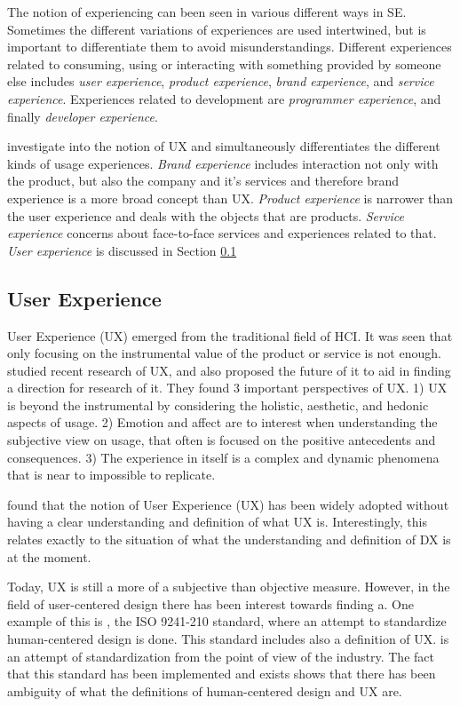 \documentclass[english, 12pt, a4paper, sci, utf8, a-1b, online]{aaltothesis}
\begin{document}
The notion of experiencing can been seen in various different ways in SE. Sometimes the different variations of experiences are used intertwined, but is important to differentiate them to avoid misunderstandings. Different experiences related to consuming, using or interacting with something provided by someone else includes \textit{user experience}, \textit{product experience}, \textit{brand experience}, and \textit{service experience}. Experiences related to development are \textit{programmer experience}, and finally \textit{developer experience}.

\textcite{understanding-ux} investigate into the notion of UX and simultaneously differentiates the different kinds of usage experiences. \textit{Brand experience} includes interaction not only with the product, but also the company and it's services and therefore brand experience is a more broad concept than UX. \textit{Product experience} is narrower than the user experience and deals with the objects that are products. \textit{Service experience} concerns about face-to-face services and experiences related to that. \textit{User experience} is discussed in Section \ref{section:ux}

\subsection{User Experience} \label{section:ux}

User Experience (UX) emerged from the traditional field of HCI. It was seen that only focusing on the instrumental value of the product or service is not enough. \textcite{ux-research-agenda} studied recent research of UX, and also proposed the future of it to aid in finding a direction for research of it. They found 3 important perspectives of UX. 1) UX is beyond the instrumental by considering the holistic, aesthetic, and hedonic aspects of usage. 2) Emotion and affect are to interest when understanding the subjective view on usage, that often is focused on the positive antecedents and consequences. 3) The experience in itself is a complex and dynamic phenomena that is near to impossible to replicate.

\textcite{understanding-ux} found that the notion of User Experience (UX) has been widely adopted without having a clear understanding and definition of what UX is. Interestingly, this relates exactly to the situation of what the understanding and definition of DX is at the moment.

Today, UX is still a more of a subjective than objective measure. However, in the field of user-centered design there has been interest towards finding a. One example of this is \textcite{iso-9241-210}, the ISO 9241-210 standard, where an attempt to standardize human-centered design is done. This standard includes also a definition of UX. \textcite{iso-9241-210} is an attempt of standardization from the point of view of the industry. The fact that this standard has been implemented and exists shows that there has been ambiguity of what the definitions of human-centered design and UX are.
\end{document}
